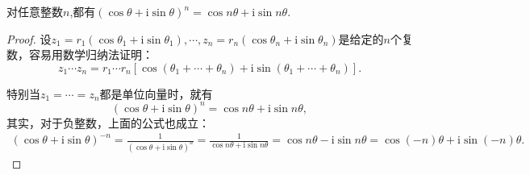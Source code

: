 \documentclass[../../main.tex]{subfiles}%
\begin{document}
\begin{theorem}[De Moivre公式]\label{theorem:De Moivre公式}
对任意整数$n$,都有$(\cos\theta + \mathrm{i}\sin\theta)^n = \cos n\theta + \mathrm{i}\sin n\theta.$
\end{theorem}
\begin{proof}
设\(z_1 = r_1(\cos\theta_1 + \mathrm{i}\sin\theta_1), \cdots, z_n = r_n(\cos\theta_n + \mathrm{i}\sin\theta_n)\)是给定的\(n\)个复数，容易用数学归纳法证明：
\[
z_1 \cdots z_n = r_1 \cdots r_n[\cos(\theta_1 + \cdots + \theta_n) + \mathrm{i}\sin(\theta_1 + \cdots + \theta_n)].
\]

特别当\(z_1 = \cdots = z_n\)都是单位向量时，就有
\[
(\cos\theta + \mathrm{i}\sin\theta)^n = \cos n\theta + \mathrm{i}\sin n\theta,
\]
其实，对于负整数，上面的公式也成立：
\begin{align*}
(\cos\theta + \mathrm{i}\sin\theta)^{-n} = \frac{1}{(\cos\theta + \mathrm{i}\sin\theta)^n} = \frac{1}{\cos n\theta + \mathrm{i}\sin n\theta} = \cos n\theta - \mathrm{i}\sin n\theta = \cos(-n)\theta + \mathrm{i}\sin(-n)\theta.
\end{align*}
\end{proof}
\end{document}

